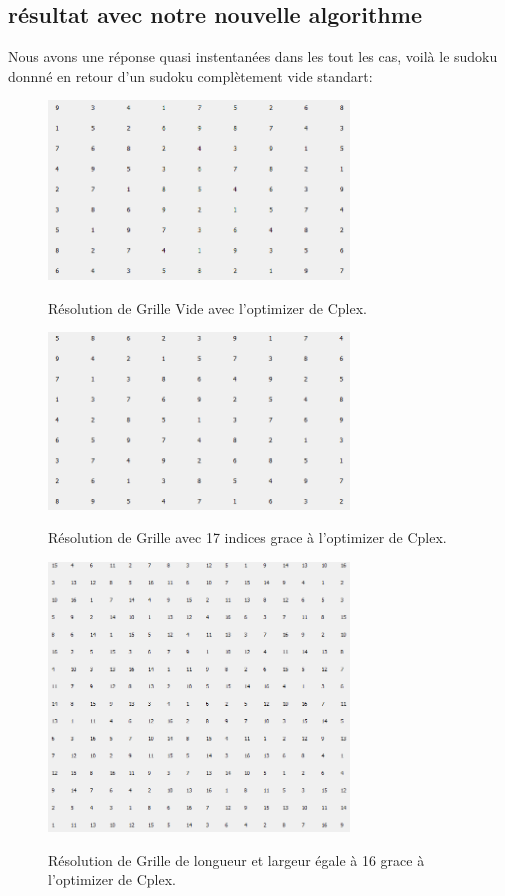 \subsection{résultat avec notre nouvelle algorithme}
Nous avons une réponse quasi instentanées dans les tout les cas, voilà le sudoku donnné en retour d'un sudoku complètement vide standart:

\begin{figure}[h]
  \begin{center}
\includegraphics[width=8cm]{./images/Res_Vide.png}\label{Test_Cplex}
\caption{Résolution de Grille Vide avec l'optimizer de Cplex.}
\end{center}
\end{figure}

\begin{figure}[h]
  \begin{center}
\includegraphics[width=8cm]{./images/Res_17.png}\label{Test_Cplex_17}
\caption{Résolution de Grille avec 17 indices grace à l'optimizer de Cplex.}
\end{center}
\end{figure}


\begin{figure}[h]
  \begin{center}
\includegraphics[width=8cm]{./images/Resultat_16_Cplex.png}\label{Test_Cplex_16_16}
\caption{Résolution de Grille de longueur et largeur égale à 16 grace à l'optimizer de Cplex.}
\end{center}
\end{figure}
\newpage
